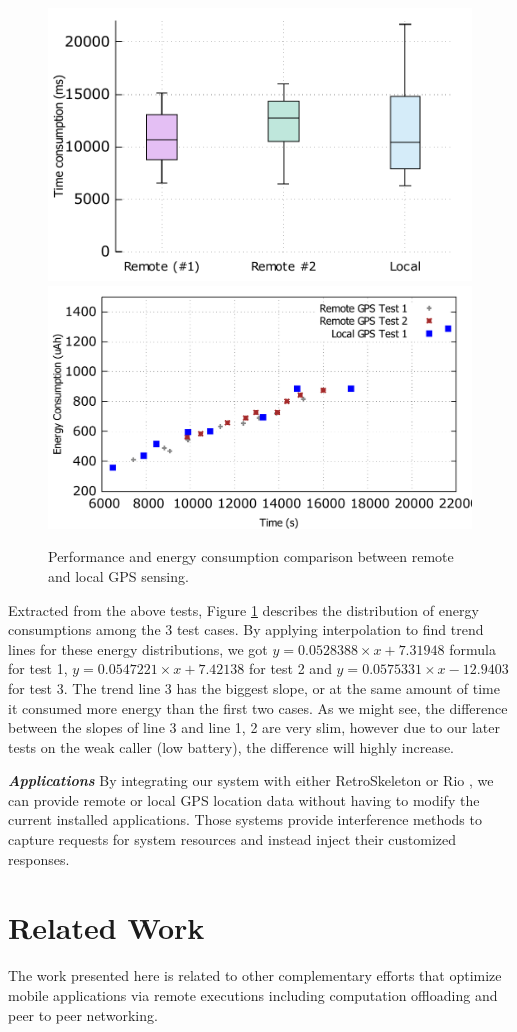 \documentclass{sig-alternate}[10pt]
\begin{document}
\begin{CCSXML}
\begin{figure}
	\centering
		\includegraphics[width=.42\textwidth]{data/gps_perf.pdf}
		\includegraphics[width=.47\textwidth]{data/gps_energy_full.pdf}
	\caption{Performance and energy consumption comparison between remote and local GPS sensing.}
	\label{fig:gps_perf}
\end{figure}

Extracted from the above tests, Figure \ref{fig:gps_perf} describes the distribution of energy consumptions among the 3 test cases. By applying interpolation to find trend lines for these energy distributions, we got $y = 0.0528388 \times x + 7.31948$ formula for test 1, $y = 0.0547221 \times x + 7.42138$ for test 2 and $y = 0.0575331 \times x - 12.9403$ for test 3. The trend line 3 has the biggest slope, or at the same amount of time it consumed more energy than the first two cases. As we might see, the difference between the slopes of line 3 and line 1, 2 are very slim, however due to our later tests on the weak caller (low battery), the difference will highly increase. 

\textbf{\emph{Applications}}
By integrating our system with either RetroSkeleton \cite{retro-skel} or Rio \cite{rio}, we can provide remote or local GPS location data without having to modify the current installed applications. Those systems provide interference methods to capture requests for system resources and instead inject their customized responses. 

\section{Related Work}
\label{sec:related}
The work presented here is related to other complementary efforts that optimize mobile applications via remote executions including computation offloading and peer to peer networking.


\end{CCSXML}
\end{document}
